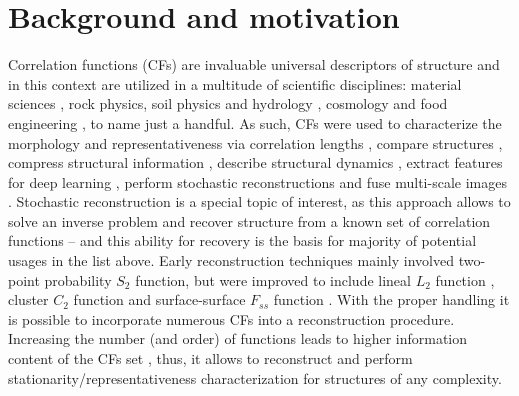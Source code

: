 \documentclass[reprint,amsmath,amssymb,aps,pre]{revtex4-1}
\begin{document}
\section{Background and motivation}
Correlation functions (CFs) are invaluable universal descriptors of
structure and in this context are utilized in a multitude of scientific
disciplines: material sciences \cite{Cecen}, rock physics, soil physics
\cite{Euras2012;PLoS_ONE;KarsaninaEJSS} and hydrology \cite{Schluter}, cosmology
\cite{oldJap} and food engineering \cite{Antonio}, to name just a handful. As
such, CFs were used to characterize the morphology \cite{tensorPRE} and
representativeness via correlation lengths \cite{Capek,Adler-Thovert}, compare
structures \cite{recons;REVpaper}, compress structural information
\cite{SciRep;Havelka}, describe structural dynamics \cite{Jiao_dynamo;PLoS_ONE},
extract features for deep learning \cite{Tahmasebi;Torq_SciRep;KarsaninaEJSS},
perform stochastic reconstructions
\cite{Adler;Y-T1998;EPL;Jiao;TahmasebiPRL;ourPRL} and fuse multi-scale images
\cite{SciRep;Jiao_multi;Karsanina2018;Tahmasebi2018}. Stochastic reconstruction
is a special topic of interest, as this approach allows to solve an inverse
problem and recover structure from a known set of correlation functions – and
this ability for recovery is the basis for majority of potential usages in the
list above. Early reconstruction techniques mainly involved two-point
probability $S_2$ function, but were improved to include lineal $L_2$ function
\cite{Y-T3D;Capek}, cluster $C_2$ function \cite{JiaoPNAS;JiaoChawla} and
surface-surface $F_{ss}$ function \cite{JiaoPNAS}. With the proper handling
\cite{EPL2} it is possible to incorporate numerous CFs into a reconstruction
procedure. Increasing the number (and order) of functions leads to higher
information content of the CFs set \cite{Gommes1-2}, thus, it allows to
reconstruct and perform stationarity/representativeness characterization
\cite{REV_paper;newPRL} for structures of any complexity.
\end{document}

